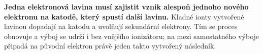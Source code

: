 \textbf{Jedna elektronová lavina musí zajistit vznik alespoň jednoho nového elektronu na katodě, který spustí další lavinu.} Kladné ionty vytvořené lavinou dopadají na katodu a uvolňují sekundární elektrony. Tím se proces obnovuje a výboj se udrží i bez vnějšího ionizátoru; na mezi samostatného výboje připadá na původní elektron právě jeden takto vytvořený následník.

